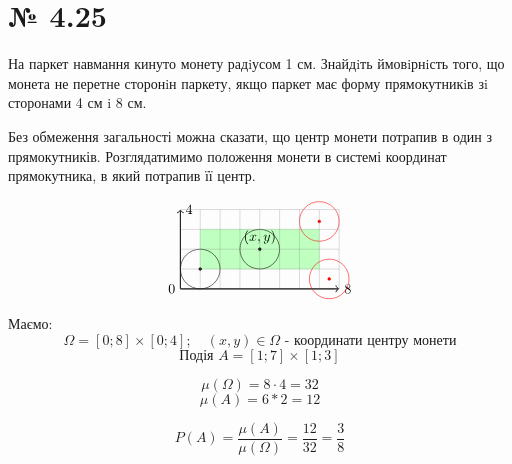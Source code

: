 \section*{№ 4.25}
\begin{mdframed}
	На паркет навмання кинуто монету радiусом 1 см. Знайдiть ймовiрнiсть того,
	що монета не перетне сторонiн паркету, якщо паркет має форму прямокутникiв
	зi сторонами 4 см i 8 см.
\end{mdframed}

Без обмеження загальності можна сказати, що центр монети потрапив в один з прямокутників.
Розглядатимимо положення монети в системі координат прямокутника, в який потрапив її центр.

$$
\begin{tikzpicture}
	\filldraw[green!25] (0.5,0.5) -- (0.5,1.5) -- (3.5,1.5) -- (3.5,0.5) -- cycle;
	\draw[thick,->] (0,0) node[left]{0} -- (4,0) node[right]{8};
	\draw[thick,->] (0,0) -- (0,2) node[right]{4};
	\draw (0.5,0.5) circle (0.5);
	\filldraw (0.5,0.5) circle (1pt);
	\draw (2,1) circle (0.5) node[above ,black] {$(x,y)$};
	\filldraw (2,1) circle (1pt);
	\draw[red] (3.5,1.7) circle (0.5);
	\filldraw[red] (3.5,1.7) circle (1pt);
	\draw[red] (3.75,0.25) circle (0.5);
	\filldraw[red] (3.75,0.25) circle (1pt);
	\draw[step=0.5cm,gray,very thin] (0,0) grid (4,2);
\end{tikzpicture}
$$

Маємо:
$$ \Omega = [0;8]\times [0;4]; \quad (x,y) \in \Omega \text{ - координати центру монети}$$
$$ \text{Подія } A = [1;7] \times [1;3]$$

$$\mu(\Omega) = 8\cdot 4 = 32$$
$$\mu(A) = 6*2 = 12$$

\begin{mdframed}[style=ans]
	$$ P(A) = \frac{\mu(A)}{\mu(\Omega)} = \frac{12}{32} = \frac{3}{8} $$
\end{mdframed}